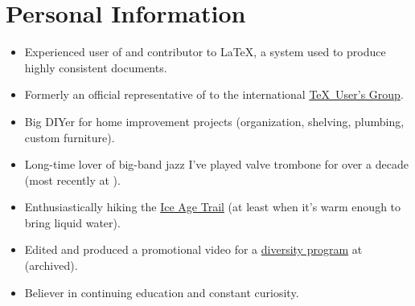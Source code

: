 \documentclass{simplecv}
\newif\ifinterests
\begin{document}
\section{Personal Information}
\begin{itemize}
\item Experienced user of and contributor to \LaTeX, a system
  used to produce highly consistent documents.
\item Formerly an official representative of
  \href{http://meta.tex.stackexchange.com/a/4174/17423}{}
  to the international \href{http://www.tug.org}{\TeX\ User's Group}.
\item Big DIYer for home improvement projects (organization,
  shelving, plumbing, custom furniture).
\item Long-time lover of big-band jazz \Dash I've played valve
  trombone for over a decade (most recently at
  ).
\item Enthusiastically hiking the
  \href{https://www.iceagetrail.org}{Ice Age Trail} (at least when
  it's warm enough to bring liquid water).
\item Edited and produced a promotional video for a \href{%
    http://www.smcm.edu/academics/desousa-brent-scholars/}{diversity program}
  at  (archived).
\item Believer in continuing education and constant curiosity.
\end{itemize}

\vfill

\ifinterests
\section{Relevant Interests}
I have several interests in which I have no formal training,
  but have some experience.
These include:

\bigskip

\begin{minipage}[t]{0.55\linewidth}
  \begin{itemize}\RaggedRight
  \item structured documents, especially in the context of $\downarrow$
  \item literate programming \Dash a documentation-centric paradigm
    for software development and reproducible research,
  \end{itemize}
\end{minipage}
\hfill
\begin{minipage}[t]{0.4\linewidth}
  \begin{itemize}
  \item custom electronics and embedded systems,
  \item language design/development, and
  \item typography.
  \end{itemize}
\end{minipage}
\vfill

\centering
Additional details on my projects and interests can be found at
  \url{https://www.seanallred.com}.
\fi
\vfill
\end{document}
